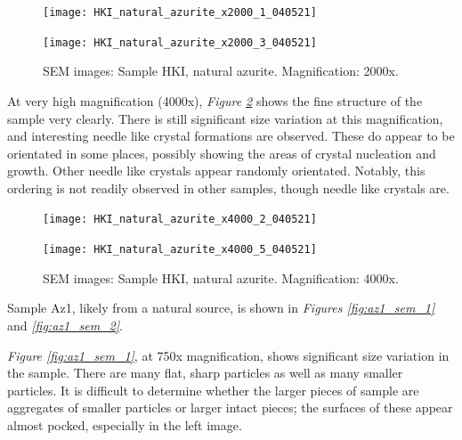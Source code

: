 \begin{figure}[H]
\centering
\begin{minipage}{.45\textwidth}
  \centering
  \texttt{[image: HKI\_natural\_azurite\_x2000\_1\_040521]}
\end{minipage}
\begin{minipage}{.45\textwidth}
  \centering
  \texttt{[image: HKI\_natural\_azurite\_x2000\_3\_040521]}
\end{minipage}
\caption[SEM images: Sample HKI, natural azurite]{SEM images: Sample HKI, natural azurite. Magnification: 2000x.}
\label{fig:hki_nat_az_sem_4}
\end{figure}

At very high magnification (4000x), \textit{Figure \ref{fig:hki_nat_az_sem_5}} shows the fine structure of the sample very clearly. There is still significant size variation at this magnification, and interesting needle like crystal formations are observed. These do appear to be orientated in some places, possibly showing the areas of crystal nucleation and growth. Other needle like crystals appear randomly orientated. Notably, this ordering is not readily observed in other samples, though needle like crystals are.

\begin{figure}[H]
\centering
\begin{minipage}{.45\textwidth}
  \centering
  \texttt{[image: HKI\_natural\_azurite\_x4000\_2\_040521]}
\end{minipage}
\begin{minipage}{.45\textwidth}
  \centering
  \texttt{[image: HKI\_natural\_azurite\_x4000\_5\_040521]}
\end{minipage}
\caption[SEM images: Sample HKI, natural azurite]{SEM images: Sample HKI, natural azurite. Magnification: 4000x.}
\label{fig:hki_nat_az_sem_5}
\end{figure}


Sample Az1, likely from a natural source, is shown in \textit{Figures \ref{fig:az1_sem_1}} and \textit{\ref{fig:az1_sem_2}}. 

\textit{Figure \ref{fig:az1_sem_1}}, at 750x magnification, shows significant size variation in the sample. There are many flat, sharp particles as well as many smaller particles. It is difficult to determine whether the larger pieces of sample are aggregates of smaller particles or larger intact pieces; the surfaces of these appear almost pocked, especially in the left image.

